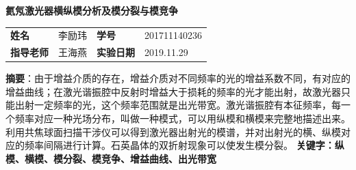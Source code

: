 \documentclass[UTF8]{ctexart}
\begin{document}
\begin{center}
\huge\textbf{氦氖激光器横纵模分析及模分裂与模竞争}
\renewcommand{\baselinestretch}{5.0}
\end{center}
\begin{center}
\small
\begin{tabular}{llll}
\textbf{姓名}&李励玮     &\textbf{学号}  &201711140236\\
\textbf{指导老师}&王海燕 &\textbf{实验日期}& 2019.11.29\\
\end{tabular}
\end{center}

\small
\noindent\textbf{摘要}：由于增益介质的存在，增益介质对不同频率的光的增益系数不同，有对应的增益曲线；在激光谐振腔中反射时增益大于损耗的频率的光才能出射，故激光器只能出射一定频率的光，这个频率范围就是出光带宽。激光谐振腔有本征频率，每一个频率对应一种光场分布，叫做一种模式，可以用纵模和横模来完整地描述出来。利用共焦球面扫描干涉仪可以得到激光器出射光的模谱，并对出射光的横、纵模对应的频率间隔进行计算。石英晶体的双折射现象可以使发生模分裂。
\newline\textbf{关键字：纵模、横模、模分裂、模竞争、增益曲线、出光带宽}

~\\
\end{document}

